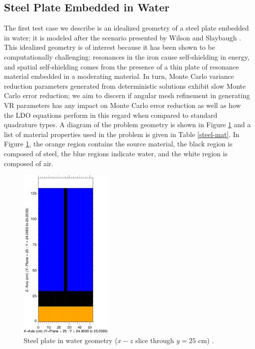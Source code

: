 \documentclass{article} %
\begin{document}
\subsection{Steel Plate Embedded in Water}
\label{sec:steel_params}

The first test case we describe is an idealized geometry of a steel plate
embedded in water; it is modeled after the scenario presented by Wilson and
Slaybaugh \cite{wilsonslaybaugh}. This idealized geometry is of interest
because it has been shown to be computationally challenging: resonances in the
iron cause self-shielding in energy, and spatial self-shielding comes from the
presence of a thin plate of resonance material embedded in a moderating
material. In turn, Monte Carlo variance reduction parameters generated from
deterministic solutions exhibit slow Monte Carlo error reduction; we aim to
discern if angular mesh refinement in generating VR parameters has any impact
on Monte Carlo error reduction as well as how the LDO equations perform in
this regard when compared to standard quadrature types. A diagram of the
problem geometry is shown in Figure \ref{steelxz} and a list of material
properties used in the problem is given in Table \ref{steel-mat}. In Figure
\ref{steelxz}, the orange region contains the source material, the black
region is composed of steel, the blue regions indicate water, and the white
region is composed of air.

\begin{figure}[!htb]
\centering
\includegraphics[width=0.4\textwidth]{steel-xz.png}
\caption{Steel plate in water geometry ($x-z$ slice through $y = 25$ cm) 
         \cite{wilsonslaybaugh}.}
\label{steelxz}
\end{figure}
\end{document}
